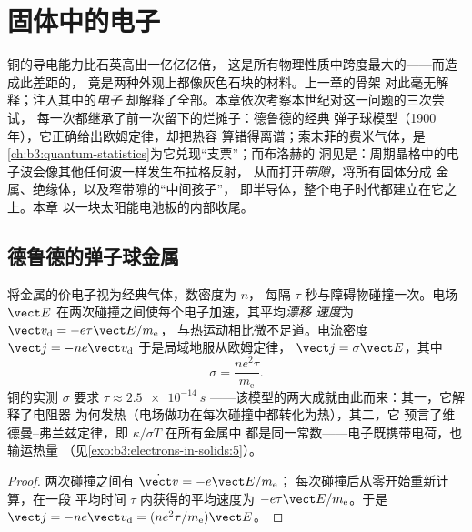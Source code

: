 \chapter{固体中的电子}\label{ch:b3:electrons-in-solids}


铜的导电能力比石英高出一亿亿亿倍，
这是所有物理性质中跨度最大的——而造成此差距的，
竟是两种外观上都像灰色石块的材料。上一章的骨架
对此毫无解释；注入其中的\emph{电子}
却解释了全部。本章依次考察本世纪对这一问题的三次尝试，
每一次都继承了前一次留下的烂摊子：德鲁德的经典
弹子球模型（1900 年），它正确给出欧姆定律，却把热容
算错得离谱；索末菲的费米气体，是
\cref{ch:b3:quantum-statistics}为它兑现“支票”；而布洛赫的
洞见是：周期晶格中的电子波会像其他任何波一样发生布拉格反射，
从而打开\emph{带隙}，将所有固体分成
金属、绝缘体，以及窄带隙的“中间孩子”，
即半导体，整个电子时代都建立在它之上。本章
以一块太阳能电池板的内部收尾。

\section{德鲁德的弹子球金属}

\begin{proposition}[德鲁德电导率]\label{prop:b3:electrons-in-solids:drude}
将金属的价电子视为经典气体，数密度为 $n$，
每隔 $\tau$ 秒与障碍物碰撞一次。电场 $\vect E$
在两次碰撞之间使每个电子加速，其平均\emph{漂移
速度}为 $\vect v_{\text{d}} = -e\tau\vect E/m_{\text{e}}$，
与热运动相比微不足道。电流密度 $\vect j =
-ne\vect v_{\text{d}}$ 于是局域地服从欧姆定律，
$\vect j = \sigma\vect E$，其中
\[
\sigma = \frac{ne^2\tau}{m_{\text{e}}} .
\]
铜的实测 $\sigma$ 要求 $\tau \approx \qty{2.5e-14}{s}$
——该模型的两大成就由此而来：其一，它解释了电阻器
为何发热（电场做功在每次碰撞中都转化为热），其二，它
预言了维德曼–弗兰兹定律，即 $\kappa/\sigma T$ 在所有金属中
都是同一常数——电子既携带电荷，也输运热量
（见\cref{exo:b3:electrons-in-solids:5}）。
\end{proposition}

\begin{proof}
两次碰撞之间有 $\dot{\vect v} = -e\vect E/m_{\text{e}}$；
每次碰撞后从零开始重新计算，在一段
平均时间 $\tau$ 内获得的平均速度为 $-e\tau\vect E/m_{\text{e}}$。于是 $\vect j =
-ne\vect v_{\text{d}} = (ne^2\tau/m_{\text{e}})\vect E$。
\end{proof}

